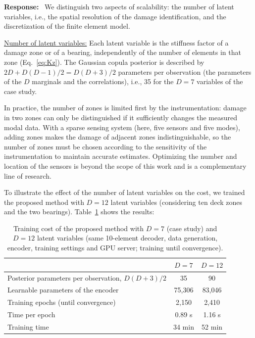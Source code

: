 \documentclass[11pt]{article}
\newenvironment{response}{\par\smallskip\noindent\color{resp}\textbf{Response:}\ }{\par}
\begin{document}
\begin{response}
We distinguish two aspects of scalability: the number of latent variables, i.e., the spatial resolution of the damage identification, and the discretization of the finite element model.

\underline{Number of latent variables:} 
Each latent variable is the stiffness factor of a damage zone or of a bearing, independently of the number of elements in that zone (Eq.~\eqref{eq:Kz}). 
The Gaussian copula posterior is described by $2D+D(D-1)/2=D(D+3)/2$ parameters per observation (the parameters of the $D$ marginals and the correlations), i.e., 35 for the $D=7$ variables of the case study. 

In practice, the number of zones is limited first by the instrumentation: damage in two zones can only be distinguished if it sufficiently changes the measured modal data. 
With a sparse sensing system (here, five sensors and five modes), adding zones makes the damage of adjacent zones indistinguishable, so the number of zones must be chosen according to the sensitivity of the instrumentation to maintain accurate estimates. Optimizing the number and location of the sensors is beyond the scope of this work and is  a complementary line of research.

To illustrate the effect of the number of latent variables on the cost, we trained the
proposed method with $D=12$ latent variables (considering ten deck zones and the two bearings). 
Table~\ref{tab:scal} shows the results:  
\begin{table}[H]
\centering\small
\caption{Training cost of the proposed method with $D=7$ (case study) and $D=12$ latent variables (same 10-element
decoder, data generation, encoder, training settings and GPU server; training until convergence).}
\label{tab:scal}
\begin{tabular}{lcc}
\toprule
 & $D=7$ & $D=12$ \\
\midrule
Posterior parameters per observation, $D(D+3)/2$ & 35 & 90 \\
Learnable parameters of the encoder & 75,306 & 83,046 \\
Training epochs (until convergence) & 2,150 & 2,410 \\
Time per epoch & 0.89 s & 1.16 s \\
Training time & 34 min & 52 min \\
\bottomrule
\end{tabular}
\end{table}


\end{response}
\end{document}
